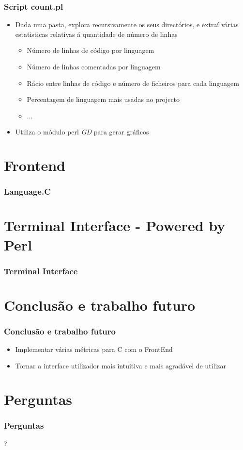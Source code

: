 \documentclass{beamer}
\begin{document}
\begin{frame} \frametitle{Script count.pl}
\begin{itemize} 
\item Dada uma pasta, explora recursivamente os seus directórios, e extraí várias estatisticas relativas á quantidade de número de linhas
  \begin{itemize}
    \item Número de linhas de código por linguagem
    \item Número de linhas comentadas por linguagem
	\item Rácio entre linhas de código e número de ficheiros para cada linguagem
	\item Percentagem de linguagem mais usadas no projecto
	\item ...
  \end{itemize}
\item Utiliza o módulo perl \textit{GD} para gerar gráficos
\end{itemize}
\end{frame}

\section{Frontend}
\begin{frame} \frametitle{Language.C}
\end{frame}

\section{Terminal Interface - Powered by Perl}
\begin{frame} \frametitle{Terminal Interface}
\end{frame}

\section{Conclusão e trabalho futuro}
\begin{frame} \frametitle{Conclusão e trabalho futuro}
\begin{itemize}
\item Implementar várias métricas para C com o FrontEnd
\item Tornar a interface utilizador mais intuitiva e mais agradável de utilizar
\end{itemize}
\end{frame}


\section*{Perguntas}
\begin{frame} \frametitle{Perguntas}
\begin{center}\huge{?}\end{center}
\end{frame}
\end{document}
